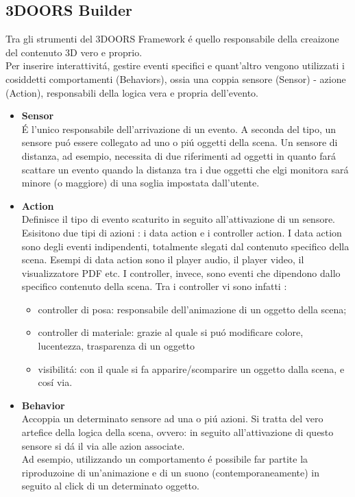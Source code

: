 \documentclass[11pt]{article}
\begin{document}
     \subsection{3DOORS Builder\texttrademark}
        Tra gli strumenti del 3DOORS Framework é quello responsabile della creaizone del contenuto 3D vero e proprio. \\
        Per inserire interattivitá, gestire eventi specifici e quant'altro vengono utilizzati i cosiddetti comportamenti (Behaviors), ossia una coppia sensore (Sensor) - azione (Action), responsabili della logica vera e propria dell'evento. \\ 
        \vspace{4mm}
        \begin{itemize}
            \item \textbf{Sensor} \\
                \vspace{1.5mm}
                É l'unico responsabile dell'arrivazione di un evento. A seconda del tipo, un sensore puó essere collegato ad uno o piú oggetti della scena. Un sensore di distanza, ad esempio, necessita di due riferimenti ad oggetti in quanto fará scattare un evento quando la distanza tra i due oggetti che elgi monitora sará minore (o maggiore) di una soglia impostata dall'utente. 
            \item \textbf{Action }\\ 
                \vspace{1.5mm}
                Definisce il tipo di evento scaturito in seguito all'attivazione di un sensore. Esisitono due tipi di azioni : i data action e i controller action. 
                I data action sono degli eventi indipendenti, totalmente slegati dal contenuto specifico della scena. Esempi di data action sono il player audio, il player video, il visualizzatore PDF etc. I controller, invece, sono eventi che dipendono dallo specifico contenuto della scena. Tra i controller vi sono infatti : \\
                \begin{itemize}
                    \item controller di posa: responsabile dell'animazione di un oggetto della scena;
                    \item controller di materiale: grazie al quale si puó modificare colore, lucentezza, trasparenza di un oggetto
                    \item visibilitá: con il quale si fa apparire/scomparire un oggetto dalla scena, e cosí via.
                \end{itemize}
            \item \textbf{Behavior} \\
                \vspace{1.5mm}
                Accoppia un determinato sensore ad una o piú azioni. Si tratta del vero artefice della logica della scena, ovvero: in seguito all'attivazione di questo sensore si dá il via alle azion associate.\\
                Ad esempio, utilizzando un comportamento é possibile far partite la riproduzoine di un'animazione e di un suono (contemporaneamente) in seguito al click di un determinato oggetto. 
        \end{itemize}
\end{document}
